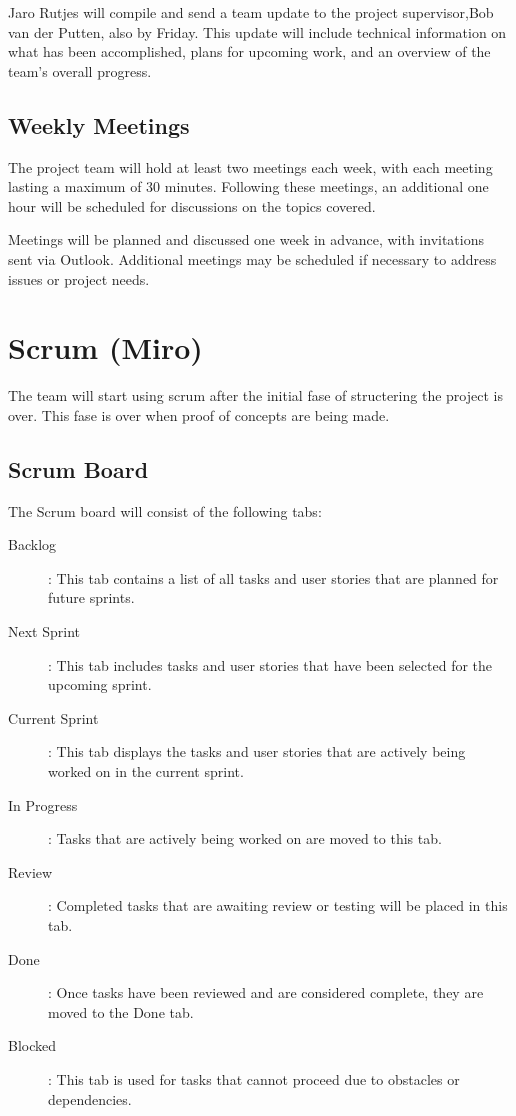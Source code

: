 \documentclass{projdoc}
\begin{document}
Jaro Rutjes will compile and send a team update to the project supervisor,Bob 
van der Putten, also by Friday. This update will include technical information 
on what has been accomplished, plans for upcoming work, and an overview of the 
team's overall progress.

\subsection{Weekly Meetings}
The project team will hold at least two meetings each week, with each meeting 
lasting a maximum of 30 minutes. Following these meetings, an additional one 
hour will be scheduled for discussions on the topics covered.

Meetings will be planned and discussed one week in advance, with invitations 
sent via Outlook. Additional meetings may be scheduled if necessary to address 
issues or project needs.



\section{Scrum (Miro)}

The team will start using scrum after the initial fase of structering the project is over. This fase is over when proof of concepts are being made.

\subsection{Scrum Board}
The Scrum board \autocite{miro:scrum-board} will consist of the following tabs:

\begin{description}
	\item[Backlog]: This tab contains a list of all tasks and user stories that are planned for future sprints.
	\item[Next Sprint]: This tab includes tasks and user stories that have been selected for the upcoming sprint.
	\item[Current Sprint]: This tab displays the tasks and user stories that are actively being worked on in the current sprint.
	\item[In Progress]: Tasks that are actively being worked on are moved to this tab.
	\item[Review]: Completed tasks that are awaiting review or testing will be placed in this tab.
	\item[Done]: Once tasks have been reviewed and are considered complete, they are moved to the Done tab.
	\item [Blocked]: This tab is used for tasks that cannot proceed due to obstacles or dependencies.
\end{description}
\end{document}
